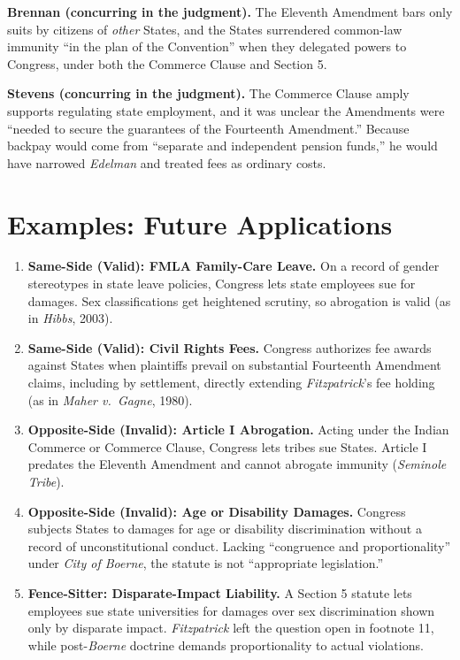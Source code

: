 \documentclass[12pt]{article}
\begin{document}
\textbf{Brennan (concurring in the judgment).} The Eleventh Amendment bars only suits by citizens of \emph{other} States, and the States surrendered common-law immunity ``in the plan of the Convention'' when they delegated powers to Congress, under both the Commerce Clause and Section 5.

\textbf{Stevens (concurring in the judgment).} The Commerce Clause amply supports regulating state employment, and it was unclear the Amendments were ``needed to secure the guarantees of the Fourteenth Amendment.'' Because backpay would come from ``separate and independent pension funds,'' he would have narrowed \textit{Edelman} and treated fees as ordinary costs.

\section{Examples: Future Applications}

\begin{enumerate}
\item \textbf{Same-Side (Valid): FMLA Family-Care Leave.} On a record of gender stereotypes in state leave policies, Congress lets state employees sue for damages. Sex classifications get heightened scrutiny, so abrogation is valid (as in \textit{Hibbs}, 2003).
\item \textbf{Same-Side (Valid): Civil Rights Fees.} Congress authorizes fee awards against States when plaintiffs prevail on substantial Fourteenth Amendment claims, including by settlement, directly extending \textit{Fitzpatrick}'s fee holding (as in \textit{Maher v.\ Gagne}, 1980).
\item \textbf{Opposite-Side (Invalid): Article I Abrogation.} Acting under the Indian Commerce or Commerce Clause, Congress lets tribes sue States. Article I predates the Eleventh Amendment and cannot abrogate immunity (\textit{Seminole Tribe}).
\item \textbf{Opposite-Side (Invalid): Age or Disability Damages.} Congress subjects States to damages for age or disability discrimination without a record of unconstitutional conduct. Lacking ``congruence and proportionality'' under \textit{City of Boerne}, the statute is not ``appropriate legislation.''
\item \textbf{Fence-Sitter: Disparate-Impact Liability.} A Section 5 statute lets employees sue state universities for damages over sex discrimination shown only by disparate impact. \textit{Fitzpatrick} left the question open in footnote 11, while post-\textit{Boerne} doctrine demands proportionality to actual violations.
\end{enumerate}
\end{document}
